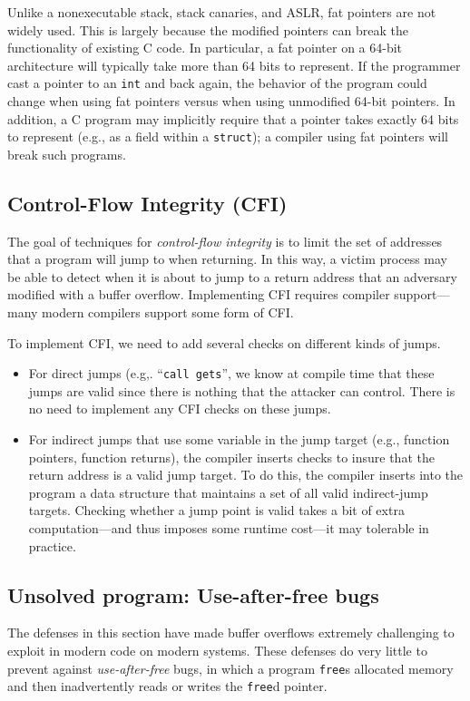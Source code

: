Unlike a nonexecutable stack, stack canaries, and ASLR, fat pointers are not widely used. This is largely because the modified  pointers 
can break the functionality of existing C code.
In particular, a fat pointer on a 64-bit architecture will typically take more than
64 bits to represent.
If the programmer cast a pointer to an \texttt{int} and back again, 
the behavior of the program could change when using fat pointers 
versus when using unmodified 64-bit pointers.
In addition, a C program may implicitly require that a pointer
takes exactly 64 bits to represent (e.g., as a field within a \texttt{struct});
a compiler using fat pointers will break such programs.

\subsection{Control-Flow Integrity (CFI)}

The goal of techniques for \emph{control-flow integrity} is to limit the set
of addresses that a program will jump to when returning.
In this way, a victim process may be able to detect when it is about to jump
to a return address that an adversary modified with a buffer overflow.
Implementing CFI requires compiler support---many modern compilers 
support some form of CFI.

To implement CFI, we need to add several checks on different kinds of jumps.
\begin{itemize}
  \item For direct jumps (e.g,. ``\texttt{call gets}'', we know at compile time that these jumps are valid since there is nothing that the attacker can control. There is no need to implement any CFI checks on these jumps.
\item For indirect jumps 
  that use some variable in the jump target
  (e.g., function pointers, function returns), 
  the compiler inserts checks to insure that the return address is a valid jump target.
    To do this, the compiler inserts into the program a data structure that
    maintains a set of all valid indirect-jump targets.
  Checking whether a jump point is valid takes a bit of extra computation---and
      thus imposes some runtime cost---it may tolerable in practice.
\end{itemize}

\subsection{Unsolved program: Use-after-free bugs}
The defenses in this section have made buffer overflows extremely challenging to
exploit in modern code on modern systems.
These defenses do very little to prevent against \emph{use-after-free} bugs,
in which a program \texttt{free}s allocated memory and then inadvertently
reads or writes the \texttt{free}d pointer.

